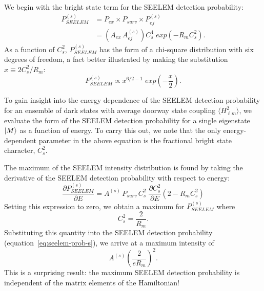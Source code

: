 We begin with the bright state term for the SEELEM detection probability:
\begin{equation}
  \label{eq:seelem-prob-s}
  \begin{split}
    P_{SEELEM}^{(s)} &= P_{ex} \times P_{surv} \times P_{ej}^{(s)}\\
    &= \left( A_{ex} \, A_{ej}^{(s)} \right) C_s^4 \; exp \left( -R_m
      C_s^2 \right).
  \end{split}
\end{equation}
As a function of $C_s^2$, $P_{SEELEM}^{(s)}$ has the form of a
chi-square distribution with six degrees of freedom, a fact
better illustrated by making the substitution $x \equiv 2 C_s^2 /
R_m$:
\begin{equation}
  \label{eq:seelem-prob-chisq}
  P_{SEELEM}^{(s)} \propto x^{6/2 - 1} \; exp \left( - \frac{x}{2} \right).
\end{equation}


To gain insight into the energy dependence of the SEELEM detection
probability for an ensemble of dark states with average doorway state
coupling $\langle H_{\ell m}^2 \rangle$, we evaluate the form of the
SEELEM detection probability for a single eigenstate $\mathinner{|{M}\rangle}$ as a
function of energy.  To carry this out, we note that the only
energy-dependent parameter in the above equation is the fractional
bright state character, $C_s^2$.

The maximum of the SEELEM intensity distribution is found by taking
the derivative of the SEELEM detection probability with respect to
energy:
\begin{equation}
    \frac{\partial P_{SEELEM}^{(s)}}{\partial E} = 
       A^{(s)} \, P_{surv} \, C_s^2 \; \frac{\partial C_s^2}{\partial E} 
       \left( 2 - R_m C_s^2 \right)
\end{equation}
Setting this expression to zero, we obtain a maximum for
$P_{SEELEM}^{(s)}$ where
\begin{equation}
  C_s^2 = \frac{2}{R_m}.
\end{equation}
Substituting this quantity into the SEELEM detection probability
(equation~\ref{eq:seelem-prob-s}), we arrive at a maximum intensity of
\begin{equation}\label{eq:seelem-max-s}
  A^{(s)} \left( \frac{2}{e R_m} \right)^2.
\end{equation}
This is a surprising result: the maximum SEELEM detection probability
is independent of the matrix elements of the Hamiltonian! 

